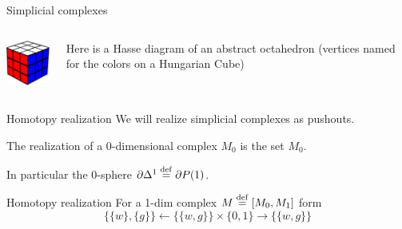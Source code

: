 \documentclass[14pt,aspectratio=169]{beamer}
\begin{document}
\begin{frame}{Simplicial complexes}
\begin{columns}
\begin{column}{0.5\textwidth}
\!\!\!\!\!\vspace{-0.5cm}\resizebox{220pt}{!}{
\begin{tikzpicture}[scale=0.1]

\end{tikzpicture}%
}
\resizebox{90pt}{!}{%

}
\quad
\includegraphics[width=60pt]{figs/hungarian_cube.pdf}
\end{column}
\begin{column}{0.5\textwidth}
Here is a \alert{Hasse diagram} of an abstract octahedron (vertices named for the colors on a Hungarian Cube)
\end{column}
\end{columns}
\end{frame}

\begin{frame}{Homotopy realization}
We will \alert{realize} simplicial complexes as pushouts.

The realization of a 0-dimensional complex \( M_0 \) is the set \( M_0 \).

In particular the 0-sphere \( \partial\Delta^1\stackrel{\mathrm{def}}{=} \partial P(1) \).
\end{frame}

\begin{frame}{Homotopy realization}
For a 1-dim complex \( M\stackrel{\mathrm{def}}{=} [M_0,M_1] \) form
\[
\]
\[\{\{w\}, \{g\}\}\leftarrow \{\{w, g\}\}\times\{0, 1\}\to \{\{w, g\}\}\]
\end{frame}
\end{document}
